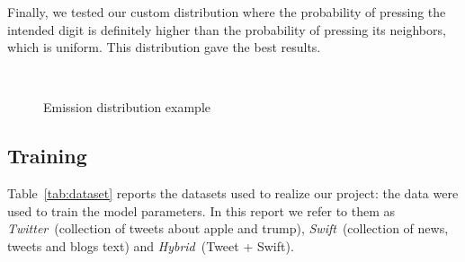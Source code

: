 \documentclass[12pt]{article}
\begin{document}
Finally, we tested our custom distribution where the probability of pressing the
intended digit is definitely higher than the probability of pressing its
neighbors, which is uniform. This distribution gave the best results.


\begin{figure}[!htbp]
\centering
{} \hspace{35pt}
 \\
\caption{Emission distribution example}
\label{matrices}
\end{figure}

\subsection{Training}\label{dataset}
Table~\ref{tab:dataset} reports the datasets used to realize our project: the
data were used to train the model parameters. In
this report we refer to them as \emph{Twitter}~(collection of tweets about apple
and trump), \emph{Swift}~(collection of news, tweets and
blogs text) and \emph{Hybrid}~(Tweet + Swift).
\end{document}
